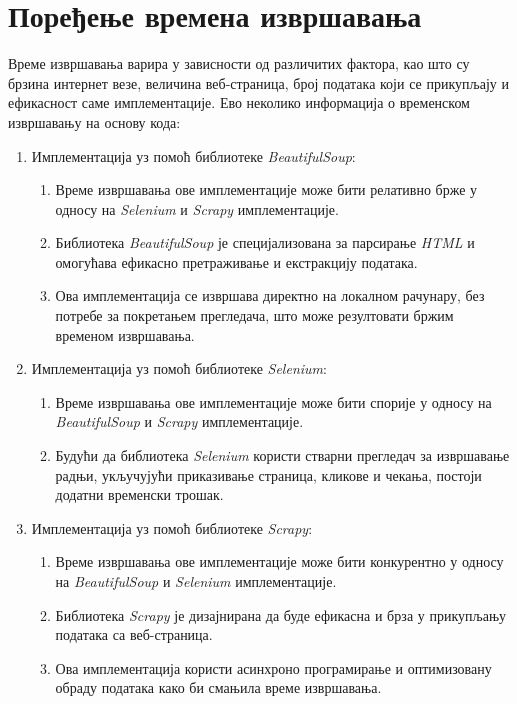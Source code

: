 \documentclass[12pt,oneside]{memoir}
\begin{document}
\section{Поређење времена извршавања}
Време извршавања варира у зависности од различитих фактора, као што су брзина интернет везе, величина веб-страница, број података који се прикупљају и ефикасност саме имплементације. Ево неколико информација о временском извршавању на основу кода:
\begin{enumerate}

\item Имплементација уз помоћ библиотеке \textit{BeautifulSoup}:
\begin{enumerate}
    \item Време извршавања ове имплементације може бити релативно брже у односу на \textit{Selenium} и \textit{Scrapy} имплементације.
    \item Библиотека \textit{BeautifulSoup} је специјализована за парсирање \textit{HTML} и омогућава ефикасно претраживање и екстракцију података.
    \item Ова имплементација се извршава директно на локалном рачунару, без потребе за покретањем прегледача, што може резултовати бржим временом извршавања.
\end{enumerate}

\item Имплементација уз помоћ библиотеке \textit{Selenium}:
\begin{enumerate}
    \item Време извршавања ове имплементације може бити спорије у односу на \textit{BeautifulSoup} и \textit{Scrapy} имплементације.
    \item Будући да библиотека \textit{Selenium} користи стварни прегледач за извршавање радњи, укључујући приказивање страница, кликове и чекања, постоји додатни временски трошак.
\end{enumerate}

\item Имплементација уз помоћ библиотеке \textit{Scrapy}:
\begin{enumerate}
    \item Време извршавања ове имплементације може бити конкурентно у односу на \textit{BeautifulSoup} и \textit{Selenium} имплементације.
    \item Библиотека \textit{Scrapy} је дизајнирана да буде ефикасна и брза у прикупљању података са веб-страница.
    \item Ова имплементација користи асинхроно програмирање и оптимизовану обраду података како би смањила време извршавања.
\end{enumerate}
\end{enumerate}
\end{document}
